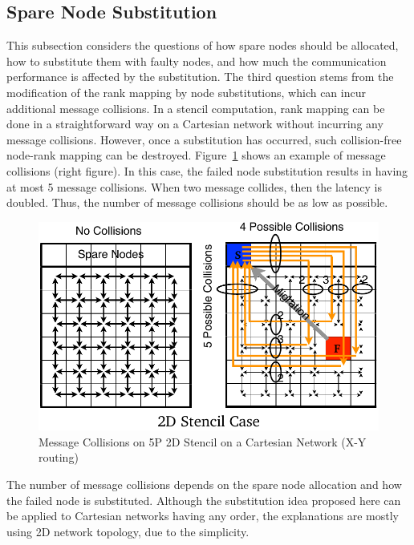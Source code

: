 \subsection{Spare Node Substitution}

This subsection considers the questions of how spare nodes should be
allocated, how to substitute them with faulty nodes, and how much the
communication performance is affected by the substitution.
The third question stems from the modification of the rank mapping by
node substitutions, which can incur additional message collisions.
In a stencil computation, rank mapping can be done in a
straightforward way on a Cartesian network without incurring any
message collisions. However, once a substitution has occurred, such
collision-free node-rank mapping can be
destroyed. Figure~\ref{fig:message-collisions} shows an example of
message collisions (right figure). In this case, the failed node
substitution results in having 
at most 5 message collisions. When two message
collides, then the latency is doubled. Thus, the number of message
collisions should be as low as possible.

\begin{figure}[ht]
\begin{center}
\includegraphics[width=0.7\columnwidth]{Figs/Collisions.pdf}
  \caption{Message Collisions on 5P 2D Stencil on a Cartesian Network
  (X-Y routing)} 
  \label{fig:message-collisions}
\end{center}
\end{figure}

The number of message collisions depends on the spare node allocation
and how the failed node is substituted. Although the substitution idea
proposed here can be applied to Cartesian networks having any order, the
explanations are mostly using 2D network topology, due to the
simplicity. 

